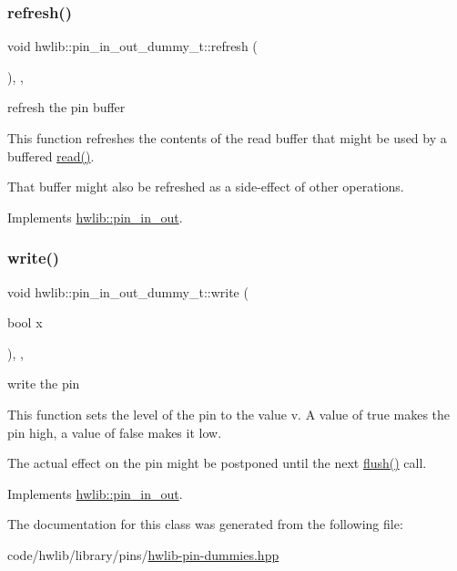 \subsubsection{\texorpdfstring{refresh()}{refresh()}}
{\footnotesize\ttfamily void hwlib\+::pin\+\_\+in\+\_\+out\+\_\+dummy\+\_\+t\+::refresh (\begin{DoxyParamCaption}{ }\end{DoxyParamCaption})\hspace{0.3cm}{\ttfamily [inline]}, {\ttfamily [override]}, {\ttfamily [virtual]}}

refresh the pin buffer

This function refreshes the contents of the read buffer that might be used by a buffered \hyperlink{classhwlib_1_1pin__in__out__dummy__t_a6cc3d99badf70aae8b076594ffd5f465}{read()}.

That buffer might also be refreshed as a side-\/effect of other operations. 

Implements \hyperlink{classhwlib_1_1pin__in__out_a8815baac4e5193ec68795956f5e363a6}{hwlib\+::pin\+\_\+in\+\_\+out}.

\mbox{\label{classhwlib_1_1pin__in__out__dummy__t_ae5ed2ec46aee911a4c3827688cbf72b8}} 
\subsubsection{\texorpdfstring{write()}{write()}}
{\footnotesize\ttfamily void hwlib\+::pin\+\_\+in\+\_\+out\+\_\+dummy\+\_\+t\+::write (\begin{DoxyParamCaption}\item[{bool}]{x }\end{DoxyParamCaption})\hspace{0.3cm}{\ttfamily [inline]}, {\ttfamily [override]}, {\ttfamily [virtual]}}

write the pin

This function sets the level of the pin to the value v. A value of true makes the pin high, a value of false makes it low.

The actual effect on the pin might be postponed until the next \hyperlink{classhwlib_1_1pin__in__out__dummy__t_ab799d24ac3180d3d7e97512410ef9994}{flush()} call. 

Implements \hyperlink{classhwlib_1_1pin__in__out_aa5e2adcb5707f86c20b6306fc09f1582}{hwlib\+::pin\+\_\+in\+\_\+out}.



The documentation for this class was generated from the following file\+:\begin{DoxyCompactItemize}
\item 
code/hwlib/library/pins/\hyperlink{hwlib-pin-dummies_8hpp}{hwlib-\/pin-\/dummies.\+hpp}\end{DoxyCompactItemize}
